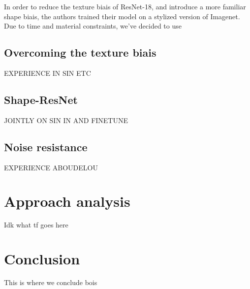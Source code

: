 \documentclass{article}
\begin{document}
In order to reduce the texture biais of ResNet-18, and introduce a more familiar shape biais, 
the authors trained their model on a stylized version of Imagenet. 
Due to time and material constraints, we've decided to use 

\subsection{Overcoming the texture biais}

EXPERIENCE IN SIN ETC

\subsection{Shape-ResNet}

JOINTLY ON SIN IN AND FINETUNE

\subsection{Noise resistance}

EXPERIENCE ABOUDELOU

\newpage
\section{Approach analysis}

Idk what tf goes here

\newpage
\section{Conclusion}

This is where we conclude bois





\end{document}
